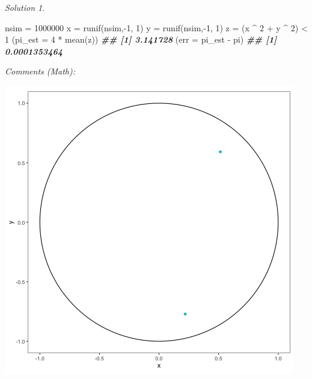 \documentclass[
]{book}
\newenvironment{Shaded}{\begin{snugshade}}{\end{snugshade}}
\newcommand{\AttributeTok}[1]{\textcolor[rgb]{0.77,0.63,0.00}{#1}}
\newcommand{\DecValTok}[1]{\textcolor[rgb]{0.00,0.00,0.81}{#1}}
\newcommand{\DocumentationTok}[1]{\textcolor[rgb]{0.56,0.35,0.01}{\textbf{\textit{#1}}}}
\newcommand{\FunctionTok}[1]{\textcolor[rgb]{0.00,0.00,0.00}{#1}}
\newcommand{\NormalTok}[1]{#1}
\newcommand{\OtherTok}[1]{\textcolor[rgb]{0.56,0.35,0.01}{#1}}
\newcommand{\SpecialCharTok}[1]{\textcolor[rgb]{0.00,0.00,0.00}{#1}}
\theoremstyle{definition}
\theoremstyle{definition}
\theoremstyle{definition}
\theoremstyle{definition}
\theoremstyle{remark}
\newtheorem*{solution}{Solution}
\begin{document}
\begin{solution}
~

\begin{Shaded}
\begin{Highlighting}[]
\NormalTok{nsim }\OtherTok{=} \DecValTok{1000000}
\NormalTok{x }\OtherTok{=}  \FunctionTok{runif}\NormalTok{(nsim,}\SpecialCharTok{{-}}\DecValTok{1}\NormalTok{, }\DecValTok{1}\NormalTok{)}
\NormalTok{y }\OtherTok{=}  \FunctionTok{runif}\NormalTok{(nsim,}\SpecialCharTok{{-}}\DecValTok{1}\NormalTok{, }\DecValTok{1}\NormalTok{)}
\NormalTok{z }\OtherTok{=}\NormalTok{ (x }\SpecialCharTok{\^{}} \DecValTok{2} \SpecialCharTok{+}\NormalTok{ y }\SpecialCharTok{\^{}} \DecValTok{2}\NormalTok{) }\SpecialCharTok{\textless{}} \DecValTok{1}
\NormalTok{(}\AttributeTok{pi\_est =} \DecValTok{4} \SpecialCharTok{*} \FunctionTok{mean}\NormalTok{(z))}
\DocumentationTok{\#\# [1] 3.141728}
\NormalTok{(}\AttributeTok{err =}\NormalTok{ pi\_est }\SpecialCharTok{{-}}\NormalTok{ pi)}
\DocumentationTok{\#\# [1] 0.0001353464}
\end{Highlighting}
\end{Shaded}

\emph{Comments (Math):}

\begin{center}\includegraphics[width=0.5\linewidth,style="float:right; padding:10px"]{pics/mc_pi} \end{center}


\end{solution}
\end{document}
